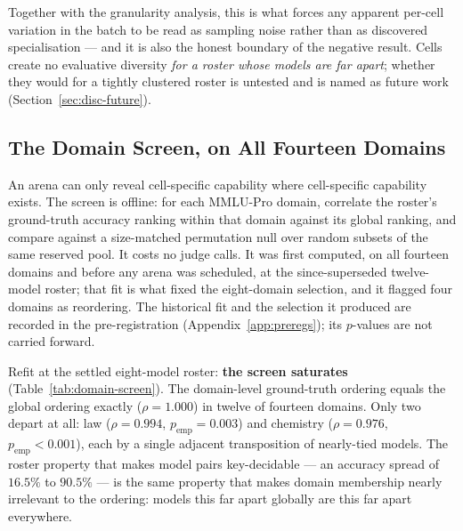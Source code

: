 Together with the granularity analysis, this is what
forces any apparent per-cell variation in the batch to be read as
sampling noise rather than as discovered specialisation --- and it is
also the honest boundary of the negative result. Cells create no
evaluative diversity \emph{for a roster whose models are far apart};
whether they would for a tightly clustered roster is untested and is
named as future work (Section~\ref{sec:disc-future}).

\subsection{The Domain Screen, on All Fourteen Domains}\label{sec:res-law}

An arena can only reveal cell-specific capability where cell-specific
capability exists. The screen is offline: for each MMLU-Pro domain,
correlate the roster's ground-truth accuracy ranking within that domain
against its global ranking, and compare against a size-matched
permutation null over random subsets of the same reserved pool. It
costs no judge calls. It was first computed, on all fourteen domains
and before any arena was scheduled, at the since-superseded
twelve-model roster; that fit is what fixed the eight-domain selection,
and it flagged four domains as reordering. The historical fit and the
selection it produced are recorded in the pre-registration
(Appendix~\ref{app:preregs}); its $p$-values are not carried forward.

Refit at the settled eight-model roster: \textbf{the
screen saturates} (Table~\ref{tab:domain-screen}). The domain-level
ground-truth ordering equals the global ordering exactly
($\rho = 1.000$) in twelve of fourteen domains. Only two depart at all:
law ($\rho = 0.994$, $p_{\text{emp}} = 0.003$) and chemistry
($\rho = 0.976$, $p_{\text{emp}} < 0.001$), each by a single adjacent
transposition of nearly-tied models. The roster property that makes
model pairs key-decidable --- an accuracy spread of $16.5\%$ to
$90.5\%$ --- is the same property that makes domain membership nearly
irrelevant to the ordering: models this far apart globally are this far
apart everywhere.

